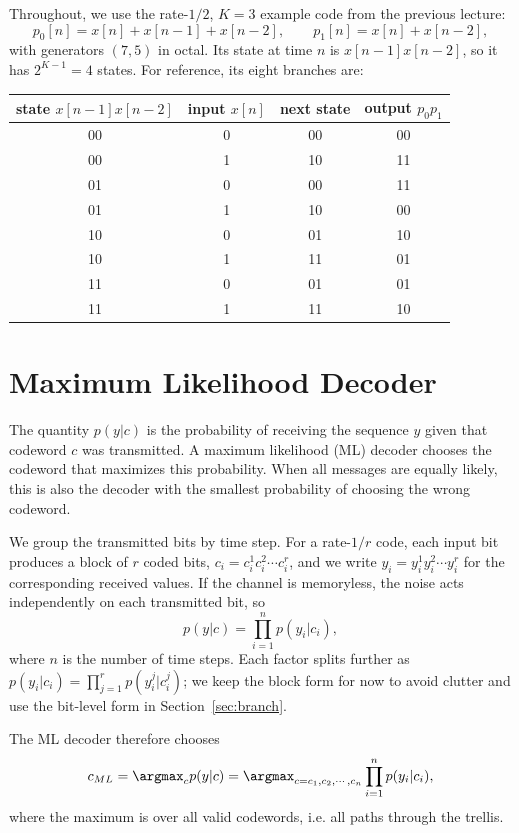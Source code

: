 Throughout, we use the rate-\(1/2\), \(K=3\) example code from the previous lecture:
\[p_0[n] = x[n] + x[n-1] + x[n-2], \qquad p_1[n] = x[n] + x[n-2],\]
with generators \((7,5)\) in octal. Its state at time \(n\) is \(x[n-1]x[n-2]\), so it has \(2^{K-1} = 4\) states. For reference, its eight branches are:
\begin{center}
\begin{tabular}{cccc}
\hline
state \(x[n-1]x[n-2]\) & input \(x[n]\) & next state & output \(p_0p_1\) \\
\hline
00 & 0 & 00 & 00 \\
00 & 1 & 10 & 11 \\
01 & 0 & 00 & 11 \\
01 & 1 & 10 & 00 \\
10 & 0 & 01 & 10 \\
10 & 1 & 11 & 01 \\
11 & 0 & 01 & 01 \\
11 & 1 & 11 & 10 \\
\hline
\end{tabular}
\end{center}

\section{Maximum Likelihood Decoder}\label{sec:ml}
The quantity \(p(y|c)\) is the probability of receiving the sequence \(y\) given that codeword \(c\) was transmitted. A maximum likelihood (ML) decoder chooses the codeword that maximizes this probability. When all messages are equally likely, this is also the decoder with the smallest probability of choosing the wrong codeword.

We group the transmitted bits by time step. For a rate-\(1/r\) code, each input bit produces a block of \(r\) coded bits, \(c_i = c_i^1 c_i^2 \cdots c_i^r\), and we write \(y_i = y_i^1 y_i^2 \cdots y_i^r\) for the corresponding received values. If the channel is memoryless, the noise acts independently on each transmitted bit, so
\begin{equation}
p(y|c) = \prod_{i=1}^{n}p(y_i|c_i), \label{eq:pyc}
\end{equation}
where \(n\) is the number of time steps. Each factor splits further as \(p(y_i|c_i) = \prod_{j=1}^{r}p(y_i^{j}|c_i^{j})\); we keep the block form for now to avoid clutter and use the bit-level form in Section~\ref{sec:branch}.

The ML decoder therefore chooses
\begin{equation}
    c_{ML} = \argmax_{c} p(y|c) = \argmax_{c=c_1, c_2, \cdots, c_n}  \prod_{i=1}^{n}p(y_i|c_i), \label{eq:MLDecoder}
\end{equation}
where the maximum is over all valid codewords, i.e. all paths through the trellis.

